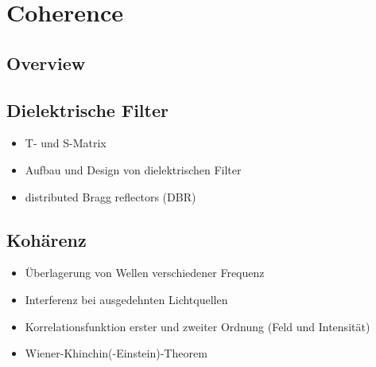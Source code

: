 \renewcommand{\lastmod}{September 18, 2023}
\renewcommand{\chapterauthors}{Markus Lippitz}

\chapter{Coherence}

\section{Overview}



\section{Dielektrische Filter}

\begin{itemize}
\item T- und S-Matrix
\item Aufbau und Design von dielektrischen Filter
\item distributed Bragg reflectors (DBR)
\end{itemize}



\section{Kohärenz}


\begin{itemize}
\item Überlagerung von Wellen verschiedener Frequenz  
\item Interferenz bei ausgedehnten Lichtquellen 
\item Korrelationsfunktion erster und zweiter Ordnung (Feld und Intensität)
\item Wiener-Khinchin(-Einstein)-Theorem 
\end{itemize}




\printbibliography[segment=\therefsegment,heading=subbibliography]
